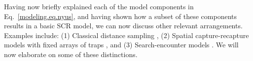 Having now briefly explained each of the model components in
Eq.~\ref{modeling.eq.nyus}, and having
shown how a subset of these components results in a basic SCR model,
we can now discuss other relevant arrangements.
Examples include:
(1) Classical distance sampling \citep{buckland_etal:2001, borchers_etal:2002},
(2) Spatial capture-recapture models with fixed arrays of traps
    \citep{efford:2004, borchers_efford:2008, royle_etal:2009ecol,
           royle_etal:2009jae,
           gardner_etal:2010ecol,royle_etal:2011jwm}, and
(3) Search-encounter models \citep{royle_young:2008,
  royle_etal:2011mee}. %
We will now elaborate on some of these distinctions.
